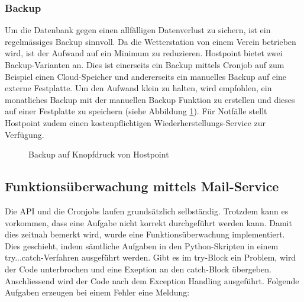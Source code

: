 \subsubsection{Backup}
Um die Datenbank gegen einen allfälligen Datenverlust zu sichern, ist ein regelmässiges Backup sinnvoll. Da die Wetterstation von einem Verein betrieben wird, ist der Aufwand auf ein Minimum zu reduzieren. Hostpoint bietet zwei Backup-Varianten an. Dies ist einerseits ein Backup mittels Cronjob auf zum Beispiel einen Cloud-Speicher und andererseits ein manuelles Backup auf eine externe Festplatte. Um den Aufwand klein zu halten, wird empfohlen, ein monatliches Backup mit der manuellen Backup Funktion zu erstellen und dieses auf einer Festplatte zu speichern (siehe Abbildung \ref{img:backup}). Für Notfälle stellt Hostpoint zudem einen kostenpflichtigen Wiederherstellungs-Service zur Verfügung.

\begin{figure}[htbp!]
	\centering
	\caption{Backup auf Knopfdruck von Hostpoint}
	\label{img:backup}
\end{figure}



\subsection{Funktionsüberwachung mittels Mail-Service}\label{kap:Funktionsüberwachung}
Die API und die Cronjobs laufen grundsätzlich selbständig. Trotzdem kann es vorkommen, dass eine Aufgabe nicht korrekt durchgeführt werden kann. Damit dies zeitnah bemerkt wird, wurde eine Funktionsüberwachung implementiert. Dies geschieht, indem sämtliche Aufgaben in den Python-Skripten in einem try...catch-Verfahren ausgeführt werden. Gibt es im try-Block ein Problem, wird der Code unterbrochen und eine Exeption an den catch-Block übergeben. Anschliessend wird der Code nach dem Exception Handling ausgeführt\cite{ThePythonTutorial8.ErrorsAndExceptions:Python}. Folgende Aufgaben erzeugen bei einem Fehler eine Meldung:


